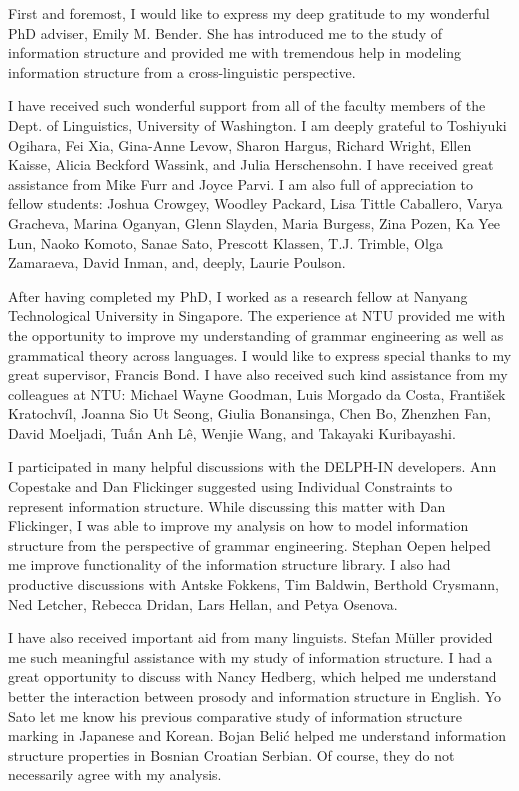 \begin{refsection}

First and foremost, I would like to express my deep gratitude to my
wonderful PhD adviser, Emily M. Bender. She has introduced me to the
study of information structure and provided me with tremendous help in
modeling information structure from a cross-linguistic perspective.


I have received such wonderful support from all of the faculty members
of the Dept. of Linguistics, University of Washington. I am deeply
grateful to Toshiyuki Ogihara, Fei Xia, Gina-Anne Levow, Sharon
Hargus, Richard Wright, Ellen Kaisse, Alicia Beckford Wassink, and
Julia Herschensohn. I have received great assistance from Mike Furr
and Joyce Parvi. I am also full of appreciation to fellow students:
Joshua Crowgey, Woodley Packard, Lisa Tittle Caballero, Varya
Gracheva, Marina Oganyan, Glenn Slayden, Maria Burgess, Zina Pozen, Ka
Yee Lun, Naoko Komoto, Sanae Sato, Prescott Klassen, T.J. Trimble,
Olga Zamaraeva, David Inman, and, deeply, Laurie Poulson.


After having completed my PhD, I worked as a research fellow at
Nanyang Technological University in Singapore. The experience at NTU
provided me with the opportunity to improve my understanding of
grammar engineering as well as grammatical theory across languages. I
would like to express special thanks to my great supervisor, Francis
Bond. I have also received such kind assistance from my colleagues at
NTU: Michael Wayne Goodman, Luis Morgado da Costa, Franti\v{s}ek
Kratochvíl, Joanna Sio Ut Seong, Giulia Bonansinga, Chen Bo, Zhenzhen
Fan, David Moeljadi, Tu{\'{\^{a}}}n Anh L\^{e}, Wenjie Wang, and
Takayaki Kuribayashi.


I participated in many helpful discussions with the DELPH-IN
developers. Ann Copestake and Dan Flickinger suggested using
Individual Constraints to represent information structure.  While
discussing this matter with Dan Flickinger, I was able to improve my
analysis on how to model information structure from the perspective of
grammar engineering. Stephan Oepen helped me improve functionality of
the information structure library.  I also had productive discussions
with Antske Fokkens, Tim Baldwin, Berthold Crysmann, Ned Letcher,
Rebecca Dridan, Lars Hellan, and Petya Osenova.



I have also received important aid from many linguists. Stefan
M{\"u}ller provided me such meaningful assistance with my study of
information structure. I had a great opportunity to discuss with 
Nancy Hedberg, which helped me understand better the interaction between 
prosody and information structure in English.  
Yo Sato let me know his previous comparative
study of information structure marking in Japanese and Korean. Bojan
Beli{\'c} helped me understand information structure properties in
Bosnian Croatian Serbian. 
Of course, they do not necessarily agree with my analysis.




\end{refsection}
